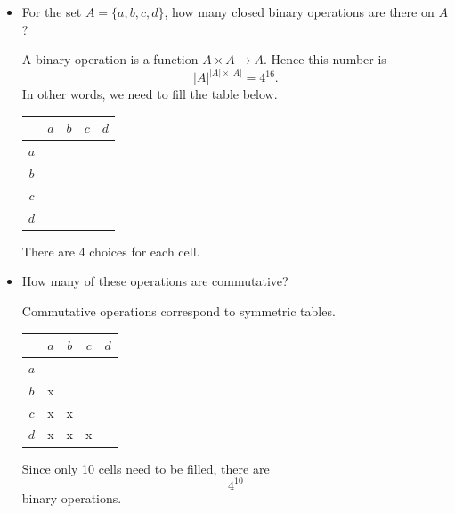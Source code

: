 \documentclass[11pt]{article}
\begin{document}
    \begin{itemize}
        \item For the set \(A = \{a,b,c,d\}\), how many closed binary operations are there on $A$? 

        \vspace{1em}
    
        A binary operation is a function \(A \times A \rightarrow A\). Hence this number is \[|A|^{|A| \times |A|} = 4^{16}.\] In other words, we need to fill the table below.
        \begin{center}
            \begin{tabular}{| c | c | c | c | c |} \hline
                     & $a$ & $b$ & $c$ & $d$ \\ \hline
                 $a$ &     &     &     &     \\ \hline
                 $b$ &     &     &     &     \\ \hline
                 $c$ &     &     &     &     \\ \hline
                 $d$ &     &     &     &     \\ \hline
            \end{tabular}
        \end{center}
        There are 4 choices for each cell.

        \item How many of these operations are commutative?
        
        \vspace{1em}

        Commutative operations correspond to symmetric tables.
        \begin{center}
            \begin{tabular}{| c | c | c | c | c |} \hline
                     & $a$ & $b$ & $c$ & $d$ \\ \hline
                 $a$ &     &     &     &     \\ \hline
                 $b$ &  x  &     &     &     \\ \hline
                 $c$ &  x  &  x  &     &     \\ \hline
                 $d$ &  x  &  x  &  x  &     \\ \hline
            \end{tabular}
        \end{center}
        Since only 10 cells need to be filled, there are \[4^{10}\] binary operations.


\end{itemize}
\end{document}
